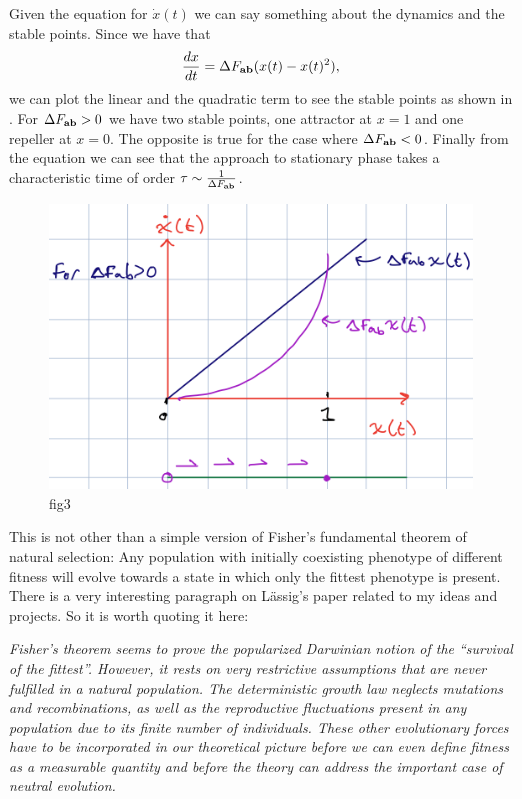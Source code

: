 Given the equation for $\dot{x}(t)$ we can say something about the dynamics and
the stable points. Since we have that
\begin{equation}
  {d{x} \over dt} = \Delta F_{\mathbf{ab}} (x(t) - x(t)^2),
\end{equation}
we can plot the linear and the quadratic term to see the stable points as shown
in . For $\Delta F_{\mathbf{ab}} > 0$ we have two stable points, one
attractor at $x = 1$ and one repeller at $x = 0$. The opposite is true for the
case where $\Delta F_{\mathbf{ab}} < 0$. Finally from the equation we can see that the approach to
stationary phase takes a characteristic time of order $\tau \sim {1 \over \Delta F_{\mathbf{ab}}}$.

\begin{figure}[h!]
	\centering \includegraphics[scale=0.5]{../fig/lassig_2007/phase_portrait.png}
	\caption{fig3}
  \label{fig_phase_portrait}
\end{figure}

This is not other than a simple version of Fisher's fundamental theorem of
natural selection: Any population with initially coexisting phenotype of
different fitness will evolve towards a state in which only the fittest
phenotype is present. There is a very interesting paragraph on L\"{a}ssig's
paper related to my ideas and projects. So it is worth quoting it here:

{\it Fisher's theorem seems to prove the popularized Darwinian notion of the
``survival of the fittest''. However, it rests on very restrictive assumptions
that are never fulfilled in a natural population. The deterministic growth law
neglects mutations and recombinations, as well as the reproductive fluctuations
present in any population due to its finite number of individuals. These other
evolutionary forces have to be incorporated in our theoretical picture before we
can even define fitness as a measurable quantity and before the theory can
address the important case of neutral evolution.}

